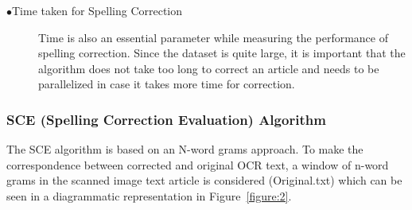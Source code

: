 \documentclass[12pt]{article}
\begin{document}
\begin{description}
\item[$\bullet$Time taken for Spelling Correction]
Time is also an essential parameter while measuring the performance of spelling correction. Since the dataset is quite large, it is important that the algorithm does not take too long to correct an article and needs to be parallelized in case it takes more time for correction.





\end{description}

\subsubsection{SCE (Spelling Correction Evaluation) Algorithm}

The SCE algorithm is based on an N-word grams approach. To make the correspondence between corrected and original OCR text, a window of n-word grams in the scanned image text article is considered (Original.txt) which can be seen in a diagrammatic representation in Figure~\ref{figure:2}.
\end{document}
